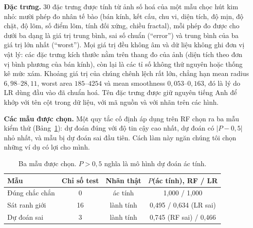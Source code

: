 \documentclass[11pt,a4paper]{article}
\begin{document}
\textbf{Đặc trưng.} 30 đặc trưng được tính từ ảnh số hoá của một mẫu chọc hút
kim nhỏ: mười phép đo nhân tế bào (bán kính, kết cấu, chu vi, diện tích, độ
mịn, độ chặt, độ lõm, số điểm lõm, tính đối xứng, chiều fractal), mỗi phép đo
được cho dưới ba dạng là giá trị trung bình, sai số chuẩn (``error'') và
trung bình của ba giá trị lớn nhất (``worst''). Mọi giá trị đều không âm và
dữ liệu không ghi đơn vị vật lý: các đặc trưng kích thước nằm trên thang đo
của ảnh (diện tích theo đơn vị bình phương của bán kính), còn lại là các tỉ
số không thứ nguyên hoặc thống kê mức xám. Khoảng giá trị của chúng chênh
lệch rất lớn, chẳng hạn mean radius $6{,}98$--$28{,}11$, worst area
$185$--$4254$ và mean smoothness $0{,}053$--$0{,}163$, đó là lý do LR dùng
đầu vào đã chuẩn hoá. Tên đặc trưng được giữ nguyên tiếng Anh để khớp với tên
cột trong dữ liệu, với mã nguồn và với nhãn trên các hình.

\textbf{Các mẫu được chọn.} Một quy tắc cố định áp dụng trên RF chọn ra ba
mẫu kiểm thử (Bảng~\ref{tab:instances}): dự đoán đúng với độ tin cậy cao
nhất, dự đoán có $|P - 0{,}5|$ nhỏ nhất, và mẫu bị dự đoán sai đầu tiên. Cách
làm này ngăn chúng tôi chọn những ví dụ có lợi cho mình.

\begin{table}[!htb]
\centering\small
\caption{Ba mẫu được chọn. $P > 0{,}5$ nghĩa là mô hình dự đoán ác tính.}\label{tab:instances}
\begin{tabular}{lccc}
\toprule
\textbf{Mẫu} & \textbf{Chỉ số test} & \textbf{Nhãn thật} & \textbf{$P$(ác tính), RF / LR}\\
\midrule
Đúng chắc chắn & 0 & ác tính & 1,000 / 1,000\\
Sát ranh giới & 16 & lành tính & 0,495 / 0,634 (LR sai)\\
Dự đoán sai & 3 & lành tính & 0,745 (RF sai) / 0,466\\
\bottomrule
\end{tabular}
\end{table}
\end{document}
